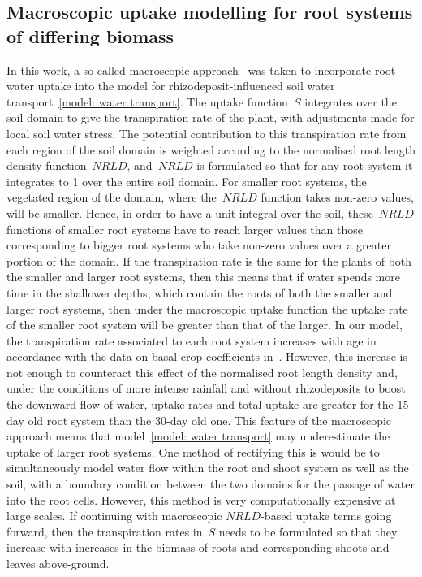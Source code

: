 \documentclass[11pt,a4paper]{article}
\numberwithin{equation}{section}
\begin{document}
\subsection{Macroscopic uptake modelling for root systems of differing biomass}
In this work, a so-called macroscopic approach~\citep{vsimuunek2009modeling, cai2018parameterization} was taken to incorporate root water uptake into the model for rhizodeposit-influenced soil water transport~\eqref{model: water transport}. The uptake function~$S$ integrates over the soil domain to give the transpiration rate of the plant, with adjustments made for local soil water stress. The potential contribution to this transpiration rate from each region of the soil domain is weighted according to the normalised root length density function~$NRLD$, and~$NRLD$ is formulated so that for any root system it integrates to 1 over the entire soil domain. For smaller root systems, the vegetated region of the domain, where the~$NRLD$ function takes non-zero values, will be smaller. Hence, in order to have a unit integral over the soil, these~$NRLD$ functions of smaller root systems have to reach larger values than those corresponding to bigger root systems who take non-zero values over a greater portion of the domain. If the transpiration rate is the same for the plants of both the smaller and larger root systems, then this means that if water spends more time in the shallower depths, which contain the roots of both the smaller and larger root systems, then under the macroscopic uptake function the uptake rate of the smaller root system will be greater than that of the larger. In our model, the transpiration rate associated to each root system increases with age in accordance with the data on basal crop coefficients in~\citep{allen1998crop}. However, this increase is not enough to counteract this effect of the normalised root length density and, under the conditions of more intense rainfall and without rhizodeposits to boost the downward flow of water, uptake rates and total uptake are greater for the 15-day old root system than the 30-day old one. This feature of the macroscopic approach means that model~\eqref{model: water transport} may underestimate the uptake of larger root systems. One method of rectifying this is would be to simultaneously model water flow within the root and shoot system as well as the soil, with a boundary condition between the two domains for the passage of water into the root cells. However, this method is very computationally expensive at large scales. If continuing with macroscopic $NRLD$-based uptake terms going forward, then the transpiration rates in~$S$ needs to be formulated so that they increase with increases in the biomass of roots and corresponding shoots and leaves above-ground.   
\end{document}
